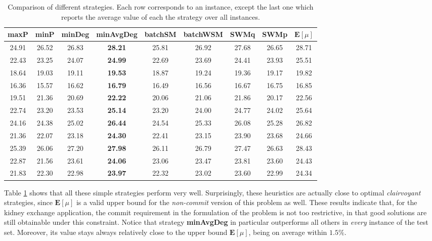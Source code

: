 \documentclass[12pt]{article}
\newcommand{\E}[1]{\mathbf{E}\left[#1\right]}
\begin{document}
\begin{table}
	\begin{center}
	\begin{tabular}{|c|c|c|c|c|c|c|c|c|}
		\hline
		maxP & minP & minDeg & minAvgDeg & batchSM & batchWSM & SWMq & SWMp & $\E{\mu}$ \\
		\hline
			
		24.91 & 26.52 & 26.83 & {\bf 28.21} & 25.81 & 26.92 & 27.68 & 26.65 & 28.71 \\
		22.43 & 23.25 & 24.07 & {\bf 24.99} & 22.69 & 23.69 & 24.41 & 23.93 & 25.51 \\
	  18.64 & 19.03 & 19.11 & {\bf 19.53} & 18.87 & 19.24 & 19.36 & 19.17 & 19.82 \\
		16.36 & 15.57 & 16.62 & {\bf 16.79} & 16.49 & 16.56 & 16.67 & 16.75 & 16.85 \\
		19.51 & 21.36 & 20.69 & {\bf 22.22} & 20.06 & 21.06 & 21.86 & 20.17 & 22.56 \\
		22.74 & 23.20 & 23.53 & {\bf 25.14} & 23.20 & 24.00 & 24.77 & 24.02 & 25.64 \\
		24.16 & 24.38 & 25.02 & {\bf 26.44} & 24.54 & 25.33 & 26.08 & 25.28 & 26.82 \\
		21.36 & 22.07 & 23.18 & {\bf 24.30} & 22.41 & 23.15 & 23.90 & 23.68 & 24.66 \\
		25.39 & 26.06 & 27.20 & {\bf 27.98} & 26.11 & 26.79 & 27.47 & 26.63 & 28.43 \\
		22.87 & 21.56 & 23.61 & {\bf 24.06} & 23.06 & 23.47 & 23.81 & 23.60 & 24.43 \\
		\hline
		21.83 & 22.30 & 22.98 & {\bf 23.97} & 22.32 & 23.02 & 23.60 & 22.99 & 24.34 \\
		\hline
	\end{tabular}
	\end{center}
	\caption{Comparison of different strategies. Each row corresponds to an instance, except the last one which reports the average value of each the strategy over all instances.}
	\label{tab:heu}
\end{table}
		
	Table \ref{tab:heu} shows that all these simple strategies perform very well. Surprisingly, these heuristics are actually close to optimal \emph{clairvoyant} strategies, since $\E{\mu}$ is a valid upper bound for the \emph{non-commit} version of this problem as well. These results indicate that, for the kidney exchange application, the commit requirement in the formulation of the problem is not too restrictive, in that good solutions are still obtainable under this constraint. Notice that strategy {\bf minAvgDeg} in particular outperforms all others in \emph{every} instance of the test set. Moreover, its value stays always relatively close to the upper bound $\E{\mu}$, being on average within $1.5\%$.
		
\end{document}
